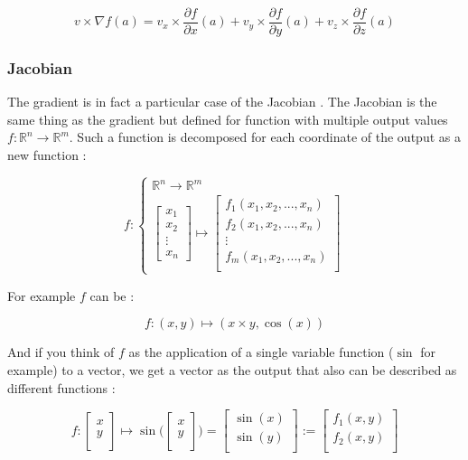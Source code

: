\documentclass[12pt]{article}
\begin{document}
$$
v \times \nabla f(a) = v_x \times \frac{\partial{f}}{\partial{x}}(a) + v_y \times \frac{\partial{f}}{\partial{y}}(a) + v_z \times \frac{\partial{f}}{\partial{z}}(a) 
$$

\subsubsection{Jacobian}

The gradient is in fact a particular case of the Jacobian \cite{wiki_jacobian}. The Jacobian is the same thing as the gradient but defined for function with multiple output values $f : \mathbb{R}^n \rightarrow \mathbb{R}^m$. Such a function is decomposed for each coordinate of the output as a new function :

$$
f : 
\begin{cases}
\mathbb{R}^n \rightarrow \mathbb{R}^m \\
\begin{bmatrix}
    x_1 \\
    x_2 \\
    \vdots \\
    x_n
\end{bmatrix} \mapsto

\begin{bmatrix}
    f_1(x_1, x_2, ..., x_n) \\
    f_2(x_1, x_2, ..., x_n) \\
    \vdots \\
    f_m(x_1, x_2, ..., x_n) \\
\end{bmatrix}

\end{cases}
$$

For example $f$ can be :

$$
f : (x,y) \mapsto (x \times y, \cos(x))
$$

And if you think of $f$ as the application of a single variable function ($\sin$ for example) to a vector, we get a vector as the output that also can be described as different functions :

$$
f : 
\begin{bmatrix}
    x \\
    y \\
\end{bmatrix}
 \mapsto \sin \big(
    \begin{bmatrix}
    x \\
    y \\
    \end{bmatrix}
 \big) = \begin{bmatrix}
    \sin(x) \\
    \sin(y) \\
\end{bmatrix}
:= \begin{bmatrix}
    f_1(x, y) \\
    f_2(x, y) \\
\end{bmatrix}
$$
\end{document}
